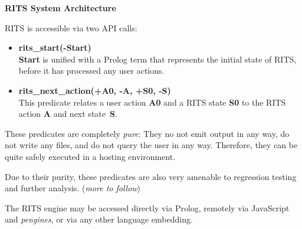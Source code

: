 \documentclass[a4paper,11pt]{article}
\begin{document}
\noindent
\begin{center}
\Large\textbf{RITS System Architecture}
\end{center}

\vspace{1cm}
\noindent
RITS is accessible via two API calls:

\begin{itemize}
\item \textbf{rits\_start(-Start)}\\\textbf{Start} is unified with a
  Prolog term that represents the initial state of RITS, before it has
  processed any user actions.

\item \textbf{rits\_next\_action(+A0, -A, +S0, -S)}\\
  This predicate relates a user action \textbf{A0} and a RITS state
  \textbf{S0} to the RITS action \textbf{A} and next state~\textbf{S}.
\end{itemize}

These predicates are completely \textit{pure}: They no not emit output
in any way, do not write any files, and do not query the user in any
way. Therefore, they can be quite safely executed in a hosting
environment.

\vspace{1cm} Due to their purity, these predicates are also very
amenable to regression testing and further analysis. (\textit{more to
  follow})

\vspace{1cm}

The RITS engine may be accessed directly via Prolog, remotely via
JavaScript and \textit{pengines}, or via any other language embedding.
\end{document}
